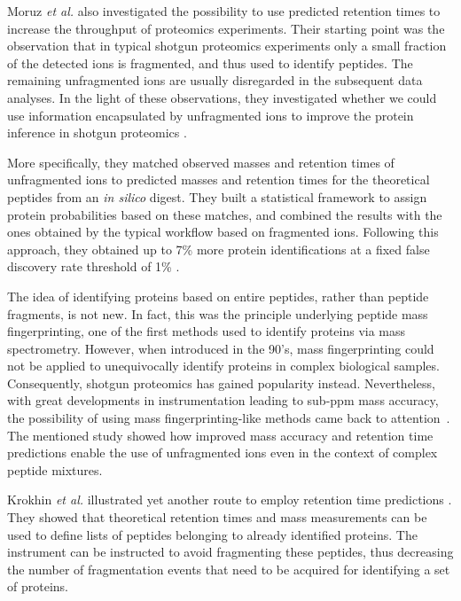\documentclass[a4paper]{article}
\begin{document}
Moruz {\em et al.} also investigated the possibility to use predicted
retention times to increase the throughput of proteomics
experiments. Their starting point was the observation that in typical
shotgun proteomics experiments only a small fraction of the detected
ions is fragmented, and thus used to identify peptides. The remaining
unfragmented ions are usually disregarded in the subsequent data
analyses. In the light of these observations, they investigated
whether we could use information encapsulated by unfragmented ions to
improve the protein inference in shotgun proteomics \cite{mf}.



More specifically, they matched observed masses and retention times of
unfragmented ions to predicted masses and retention times for the
theoretical peptides from an {\it in silico} digest. They built a
statistical framework to assign protein probabilities based on these
matches, and combined the results with the ones obtained by the
typical workflow based on fragmented ions. Following this approach, they
obtained up to 7\% more protein identifications at a fixed false
discovery rate threshold of 1\% \cite{mf}.

The idea of identifying proteins based on entire peptides, rather than
peptide fragments, is not new. In fact, this was the principle
underlying peptide mass fingerprinting, one of the first methods used
to identify proteins via mass spectrometry. However, when introduced
in the 90's, mass fingerprinting could not be applied to unequivocally
identify proteins in complex biological samples. Consequently, shotgun
proteomics has gained popularity instead. Nevertheless, with great
developments in instrumentation leading to sub-ppm mass accuracy, the
possibility of using mass fingerprinting-like methods came back to
attention~\cite{iamt1}. The mentioned study showed how improved mass
accuracy and retention time predictions enable the use of unfragmented
ions even in the context of complex peptide mixtures.

Krokhin {\em et al.} illustrated yet another route to employ retention time
predictions \cite{krokhin200612, McQueen2012}. They showed that
theoretical retention times and mass measurements can be used to
define lists of peptides belonging to already identified proteins. The
instrument can be instructed to avoid fragmenting these peptides, thus
decreasing the number of fragmentation events that need to be acquired
for identifying a set of proteins.
\end{document}
